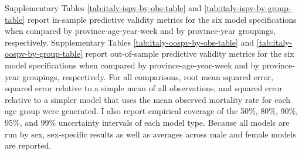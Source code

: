 \documentclass[
]{report}
\begin{document}
Supplementary Tables \ref{tab:italy-ispv-by-obs-table} and \ref{tab:italy-ispv-by-group-table} report in-sample predictive validity metrics for the six model specifications when compared by province-age-year-week and by province-year groupings, respectively. Supplementary Tables \ref{tab:italy-oospv-by-obs-table} and \ref{tab:italy-oospv-by-group-table} report out-of-sample predictive validity metrics for the six model specifications when compared by province-age-year-week and by province-year groupings, respectively. For all comparisons, root mean squared error, squared error relative to a simple mean of all observations, and squared error relative to a simpler model that uses the mean observed mortality rate for each age group were generated. I also report empirical coverage of the 50\%, 80\%, 90\%, 95\%, and 99\% uncertainty intervals of each model type. Because all models are run by sex, sex-specific results as well as averages across male and female models are reported.
\end{document}
